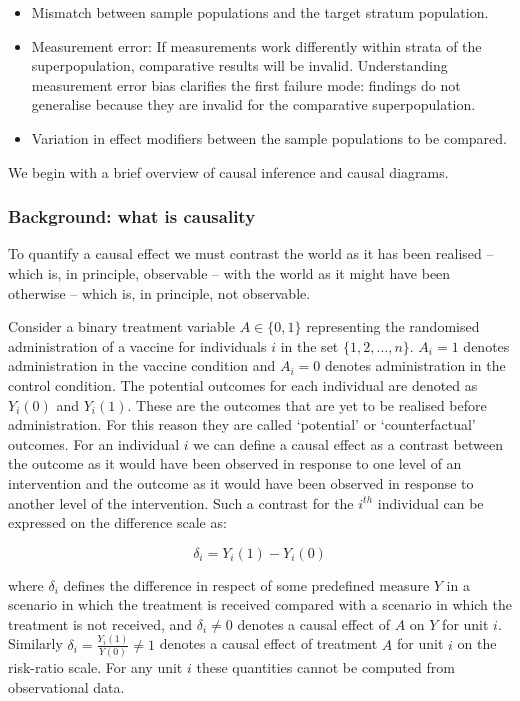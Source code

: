 \documentclass[
  single column]{article}
\providecommand{\tightlist}{%
  \setlength{\itemsep}{0pt}\setlength{\parskip}{0pt}}\usepackage{longtable,booktabs,array}
\begin{document}
\begin{itemize}
\tightlist
\item
  Mismatch between sample populations and the target stratum population.
\item
  Measurement error: If measurements work differently within strata of
  the superpopulation, comparative results will be invalid.
  Understanding measurement error bias clarifies the first failure mode:
  findings do not generalise because they are invalid for the
  comparative superpopulation.
\item
  Variation in effect modifiers between the sample populations to be
  compared.
\end{itemize}

We begin with a brief overview of causal inference and causal diagrams.

\subsubsection{Background: what is
causality}\label{background-what-is-causality}

To quantify a causal effect we must contrast the world as it has been
realised -- which is, in principle, observable -- with the world as it
might have been otherwise -- which is, in principle, not observable.

Consider a binary treatment variable \(A \in \{0,1\}\) representing the
randomised administration of a vaccine for individuals \(i\) in the set
\(\{1, 2, \ldots, n\}\). \(A_i = 1\) denotes administration in the
vaccine condition and \(A_i = 0\) denotes administration in the control
condition. The potential outcomes for each individual are denoted as
\(Y_i(0)\) and \(Y_i(1)\). These are the outcomes that are yet to be
realised before administration. For this reason they are called
`potential' or `counterfactual' outcomes. For an individual \(i\) we can
define a causal effect as a contrast between the outcome as it would
have been observed in response to one level of an intervention and the
outcome as it would have been observed in response to another level of
the intervention. Such a contrast for the \(i^{th}\) individual can be
expressed on the difference scale as:

\[
\delta_i = Y_i(1) - Y_i(0)
\]

where \(\delta_i\) defines the difference in respect of some predefined
measure \(Y\) in a scenario in which the treatment is received compared
with a scenario in which the treatment is not received, and
\(\delta_i \neq 0\) denotes a causal effect of \(A\) on \(Y\) for unit
\(i\). Similarly \(\delta_i = \frac{Y_i(1)}{Y(0)}\neq 1\) denotes a
causal effect of treatment \(A\) for unit \(i\) on the risk-ratio scale.
For any unit \(i\) these quantities cannot be computed from
observational data.
\end{document}
